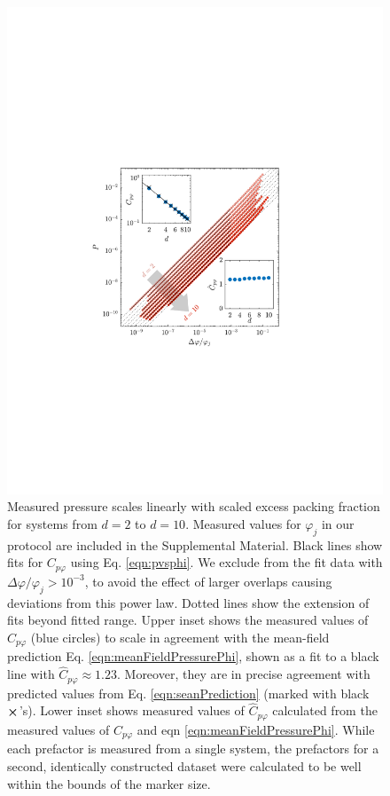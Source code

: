 %
\begin{figure}[h!]
\includegraphics[width=\columnwidth, trim=140 241 169 241, clip]{excessContactsScaling/pvsphiSub.pdf}
\caption{Measured pressure scales linearly with scaled excess packing fraction for systems from $d=2$ to $d=10$. Measured values for $\varphi_j$ in our protocol are included in the Supplemental Material. Black lines show fits for $C_{p\varphi}$ using Eq. \ref{eqn:pvsphi}. We exclude from the fit data with $\Delta\varphi/\varphi_j>10^{-3}$, to avoid the effect of larger overlaps causing deviations from this power law. Dotted lines show the extension of fits beyond fitted range. Upper inset shows the measured values of $C_{p\varphi}$ (blue circles) to scale in agreement with the mean-field prediction Eq. \ref{eqn:meanFieldPressurePhi}, shown as a fit to a black line with $\hat{C}_{p\varphi} \approx 1.23$. Moreover, they are in precise agreement with predicted values from Eq. \ref{eqn:seanPrediction} (marked with black $\boldsymbol\times$'s). Lower inset shows measured values of $\hat{C}_{p\varphi}$ calculated from the measured values of $C_{p\varphi}$ and eqn \ref{eqn:meanFieldPressurePhi}. While each prefactor is measured from a single system, the prefactors for a second, identically constructed dataset were calculated to be well within the bounds of the marker size.}
\label{plot:pvsphi}
\end{figure}
